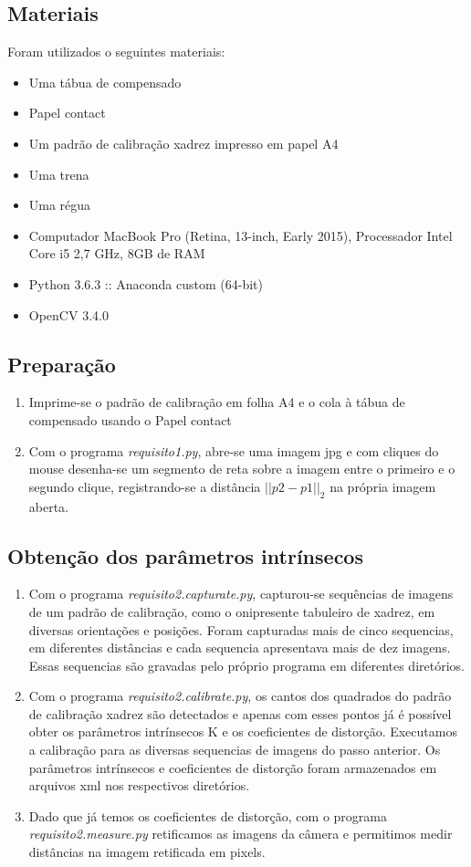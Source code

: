 \documentclass[conference]{IEEEtran}
\begin{document}
\subsection{Materiais}
Foram utilizados o seguintes materiais:
\begin{itemize}
\item Uma tábua de compensado
\item Papel contact
\item Um padrão de calibração xadrez impresso em papel A4
\item Uma trena
\item Uma régua
\item Computador MacBook Pro (Retina, 13-inch, Early 2015), Processador Intel Core i5 2,7 GHz, 8GB de RAM
\item Python 3.6.3 :: Anaconda custom (64-bit)
\item OpenCV 3.4.0
\end{itemize}

\subsection{Preparação}
 \begin{enumerate}
 \item Imprime-se o padrão de calibração em folha A4 e o cola à tábua de compensado usando o Papel contact
 \item Com o programa \textit{requisito1.py}, abre-se uma imagem jpg e com cliques do mouse desenha-se um segmento de reta sobre a imagem entre o primeiro e o segundo clique, registrando-se a distância \(||p2 - p1||_2 \) na própria imagem aberta. 
 \end{enumerate}
\subsection{Obtenção dos parâmetros intrínsecos}
 \begin{enumerate}
  \item Com o programa \textit{requisito2.capturate.py}, capturou-se sequências de imagens de um padrão de calibração, como o onipresente tabuleiro de xadrez, em diversas orientações e posições. Foram capturadas mais de cinco sequencias, em diferentes distâncias e cada sequencia apresentava mais de dez imagens. Essas sequencias são gravadas pelo próprio programa em diferentes diretórios. 
  \item Com o programa \textit{requisito2.calibrate.py}, os cantos dos quadrados do padrão de calibração xadrez são detectados e apenas com esses pontos já é possível obter os parâmetros intrínsecos K e os coeficientes de distorção.
 Executamos a calibração para as diversas sequencias de imagens do passo anterior. Os parâmetros intrínsecos e coeficientes de distorção foram armazenados em arquivos xml nos respectivos diretórios.
\item Dado que já temos os coeficientes de distorção, com o programa \textit{requisito2.measure.py} retificamos as imagens da câmera e permitimos medir distâncias na imagem retificada em pixels. 
\end{enumerate}
\end{document}
